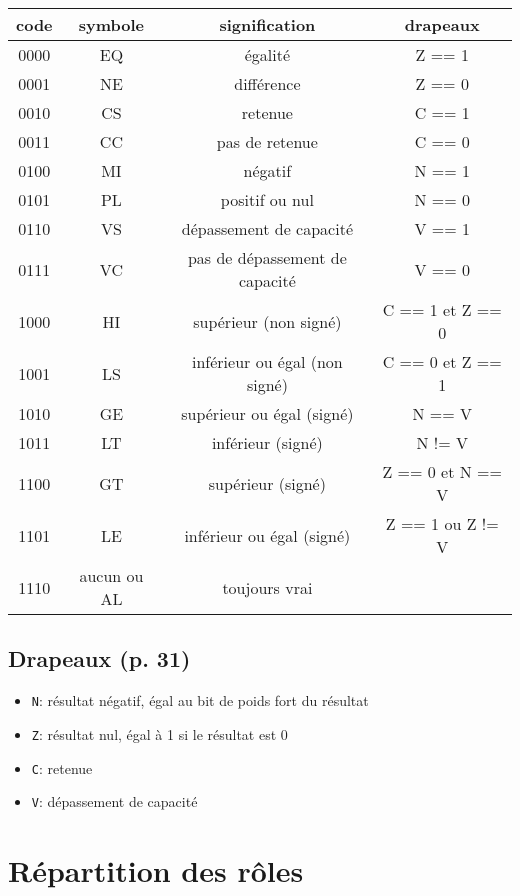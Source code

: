 \documentclass{article}
\begin{document}
\begin{tabular}{| c | c | c | c |}
\hline
\textbf{code} & \textbf{symbole} & \textbf{signification} & \textbf{drapeaux}\\
\hline
0000 & EQ & égalité & Z == 1\\
\hline
0001 & NE & différence & Z == 0\\
\hline
0010 & CS & retenue & C == 1\\
\hline
0011 & CC & pas de retenue & C == 0\\
\hline
0100 & MI & négatif & N == 1\\
\hline
0101 & PL & positif ou nul & N == 0\\
\hline
0110 & VS & dépassement de capacité & V == 1\\
\hline
0111 & VC & pas de dépassement de capacité & V == 0\\
\hline
1000 & HI & supérieur (non signé) & C == 1 et Z == 0\\
\hline
1001 & LS & inférieur ou égal (non signé) & C == 0 et Z == 1\\
\hline
1010 & GE & supérieur ou égal (signé) & N == V\\
\hline
1011 & LT & inférieur (signé) & N != V\\
\hline
1100 & GT & supérieur (signé) & Z == 0 et N == V\\
\hline
1101 & LE & inférieur ou égal (signé) & Z == 1 ou Z != V\\
\hline
1110 & aucun ou AL & toujours vrai & \\
\hline
\end{tabular}


\subsection{Drapeaux (p. 31)}

\begin{itemize}
	\item \texttt{N}: résultat négatif, égal au bit de poids fort du résultat
	\item \texttt{Z}: résultat nul, égal à 1 si le résultat est 0
	\item \texttt{C}: retenue
	\item \texttt{V}: dépassement de capacité
\end{itemize}



\section{Répartition des rôles}
\end{document}
